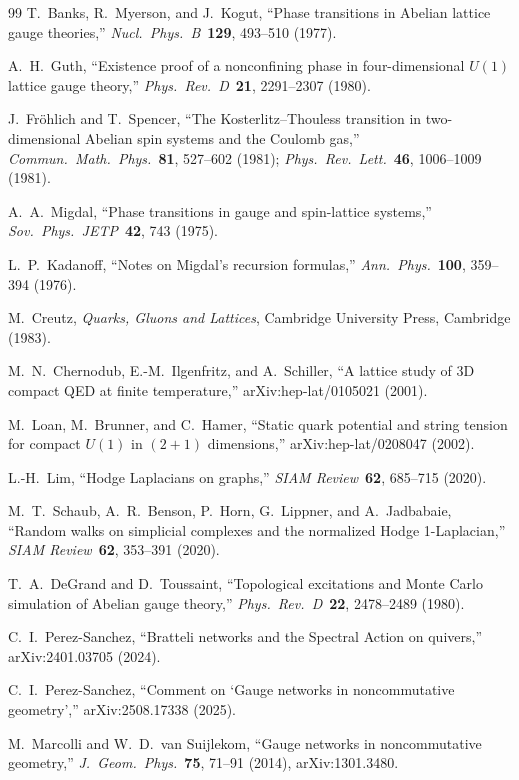 \documentclass[11pt]{article}
\begin{document}
\begin{thebibliography}{99}
T.~Banks, R.~Myerson, and J.~Kogut, ``Phase transitions in Abelian lattice
gauge theories,''
\textit{Nucl.~Phys.~B}~\textbf{129}, 493--510 (1977).

A.~H.~Guth, ``Existence proof of a nonconfining phase in four-dimensional
$U(1)$ lattice gauge theory,''
\textit{Phys.~Rev.~D}~\textbf{21}, 2291--2307 (1980).

J.~Fr\"ohlich and T.~Spencer, ``The Kosterlitz--Thouless transition in
two-dimensional Abelian spin systems and the Coulomb gas,''
\textit{Commun.~Math.~Phys.}~\textbf{81}, 527--602 (1981);
\textit{Phys.~Rev.~Lett.}~\textbf{46}, 1006--1009 (1981).

A.~A.~Migdal, ``Phase transitions in gauge and spin-lattice systems,''
\textit{Sov.~Phys.~JETP}~\textbf{42}, 743 (1975).

L.~P.~Kadanoff, ``Notes on Migdal's recursion formulas,''
\textit{Ann.~Phys.}~\textbf{100}, 359--394 (1976).

M.~Creutz, \textit{Quarks, Gluons and Lattices}, Cambridge University
Press, Cambridge (1983).

M.~N.~Chernodub, E.-M.~Ilgenfritz, and A.~Schiller,
``A lattice study of 3D compact QED at finite temperature,''
arXiv:hep-lat/0105021 (2001).

M.~Loan, M.~Brunner, and C.~Hamer, ``Static quark potential and string tension for
compact $U(1)$ in $(2+1)$ dimensions,''
arXiv:hep-lat/0208047 (2002).

L.-H.~Lim, ``Hodge Laplacians on graphs,''
\textit{SIAM Review}~\textbf{62}, 685--715 (2020).

M.~T.~Schaub, A.~R.~Benson, P.~Horn, G.~Lippner, and A.~Jadbabaie,
``Random walks on simplicial complexes and the normalized Hodge 1-Laplacian,''
\textit{SIAM Review}~\textbf{62}, 353--391 (2020).

T.~A.~DeGrand and D.~Toussaint, ``Topological excitations and Monte Carlo
simulation of Abelian gauge theory,''
\textit{Phys.~Rev.~D}~\textbf{22}, 2478--2489 (1980).

C.~I.~Perez-Sanchez, ``Bratteli networks and the Spectral Action on
quivers,'' arXiv:2401.03705 (2024).

C.~I.~Perez-Sanchez, ``Comment on `Gauge networks in noncommutative
geometry','' arXiv:2508.17338 (2025).

M.~Marcolli and W.~D.~van Suijlekom, ``Gauge networks in noncommutative
geometry,''
\textit{J.~Geom.~Phys.}~\textbf{75}, 71--91 (2014), arXiv:1301.3480.

\end{thebibliography}
\end{document}
